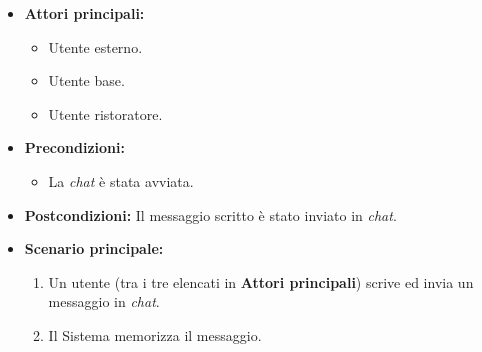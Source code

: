 \label{usecase:Invio messaggio chat}
\begin{itemize}
	\item \textbf{Attori principali:} 
	\begin{itemize}
        \item Utente esterno.
        \item Utente base.
        \item Utente ristoratore.
    \end{itemize}

	\item \textbf{Precondizioni:}
	\begin{itemize}
        \item La \textit{chat} è stata avviata.
    \end{itemize}

	\item \textbf{Postcondizioni:} Il messaggio scritto è stato inviato in \textit{chat}.

	\item \textbf{Scenario principale:}
            \begin{enumerate}
                \item Un utente (tra i tre elencati in \textbf{Attori principali}) scrive ed invia un messaggio in \textit{chat}.
                \item Il Sistema memorizza il messaggio.
	      \end{enumerate}
\end{itemize}
